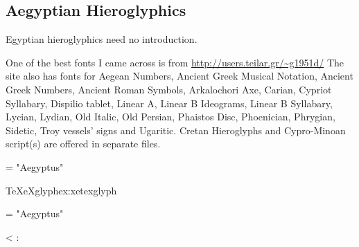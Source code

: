 \subsection{Aegyptian Hieroglyphics}
Egyptian hieroglyphics need no introduction. 

One of the best fonts I came across is  from \url{http://users.teilar.gr/~g1951d/} The site also has fonts for Aegean Numbers, Ancient Greek Musical Notation, Ancient Greek Numbers, Ancient Roman Symbols, Arkalochori Axe, Carian, Cypriot Syllabary, Dispilio tablet, Linear A, Linear B Ideograms, Linear B Syllabary, Lycian, Lydian, Old Italic, Old Persian, Phaistos Disc, Phoenician, Phrygian, Sidetic, Troy vessels’ signs and Ugaritic. Cretan Hieroglyphs and Cypro-Minoan script(s) are offered in separate files.
\medskip

\bgroup

\centering 

\font\myfont = "Aegyptus"

\scalebox{7}{\myfont\XeTeXglyph 201}
\scalebox{7}{\myfont\XeTeXglyph 203}
\scalebox{7}{\myfont\XeTeXglyph 163}
\scalebox{7}{\myfont\XeTeXglyph 164}
\scalebox{7}{\myfont\XeTeXglyph 165}
\scalebox{7}{\myfont\XeTeXglyph 168}

\egroup



\begin{texexample}{TeXeXglyph}{ex:xetexglyph}
\raggedright
\font\myfont = "Aegyptus"
\setcounter{glyphcount}{136}

\whiledo
{\value{glyphcount}<\XeTeXcountglyphs\myfont}
{:~
{\myfont\XeTeXglyph{}}\quad
{}}
\end{texexample}
